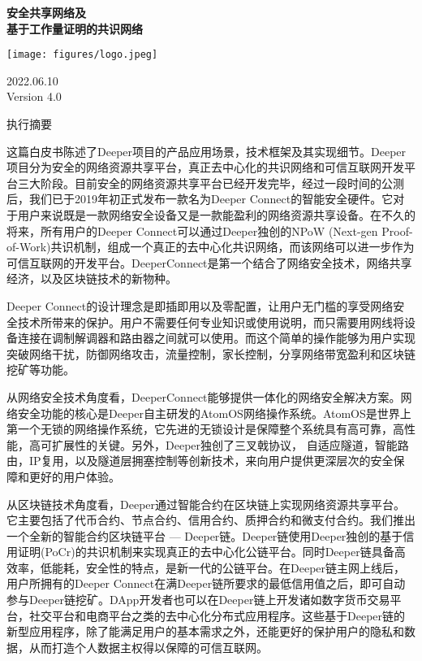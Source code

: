 \documentclass[a4paper]{article}
\begin{document}
\begin{titlepage}
	\begin{center}
		\vspace*{1cm}

		\Huge
		\textbf{安全共享网络及\\基于工作量证明的共识网络}

		\vspace{2cm}

		\texttt{[image: figures/logo.jpeg]}

		\normalsize
		2022.06.10 \\ Version 4.0
	\end{center}
\end{titlepage}

\centerline{执行摘要}
这篇白皮书陈述了Deeper项目的产品应用场景，技术框架及其实现细节。Deeper项目分为安全的网络资源共享平台，真正去中心化的共识网络和可信互联网开发平台三大阶段。目前安全的网络资源共享平台已经开发完毕，经过一段时间的公测后，我们已于2019年初正式发布一款名为Deeper Connect的智能安全硬件。它对于用户来说既是一款网络安全设备又是一款能盈利的网络资源共享设备。在不久的将来，所有用户的Deeper Connect可以通过Deeper独创的NPoW (Next-gen Proof-of-Work)共识机制，组成一个真正的去中心化共识网络，而该网络可以进一步作为可信互联网的开发平台。DeeperConnect是第一个结合了网络安全技术，网络共享经济，以及区块链技术的新物种。

Deeper Connect的设计理念是即插即用以及零配置，让用户无门槛的享受网络安全技术所带来的保护。用户不需要任何专业知识或使用说明，而只需要用网线将设备连接在调制解调器和路由器之间就可以使用。而这个简单的操作能够为用户实现突破网络干扰，防御网络攻击，流量控制，家长控制，分享网络带宽盈利和区块链挖矿等功能。

从网络安全技术角度看，DeeperConnect能够提供一体化的网络安全解决方案。网络安全功能的核心是Deeper自主研发的AtomOS网络操作系统。AtomOS是世界上第一个无锁的网络操作系统，它先进的无锁设计是保障整个系统具有高可靠，高性能，高可扩展性的关键。另外，Deeper独创了三叉戟协议， 自适应隧道，智能路由，IP复用，以及隧道层拥塞控制等创新技术，来向用户提供更深层次的安全保障和更好的用户体验。

从区块链技术角度看，Deeper通过智能合约在区块链上实现网络资源共享平台。它主要包括了代币合约、节点合约、信用合约、质押合约和微支付合约。我们推出一个全新的智能合约区块链平台 --- Deeper链。Deeper链使用Deeper独创的基于信用证明(PoCr)的共识机制来实现真正的去中心化公链平台。同时Deeper链具备高效率，低能耗，安全性的特点，是新一代的公链平台。在Deeper链主网上线后，用户所拥有的Deeper Connect在满Deeper链所要求的最低信用值之后，即可自动参与Deeper链挖矿。DApp开发者也可以在Deeper链上开发诸如数字货币交易平台，社交平台和电商平台之类的去中心化分布式应用程序。这些基于Deeper链的新型应用程序，除了能满足用户的基本需求之外，还能更好的保护用户的隐私和数据，从而打造个人数据主权得以保障的可信互联网。
\end{document}
